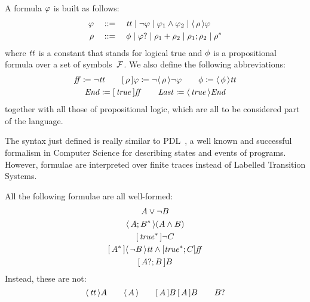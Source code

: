 \begin{definition}
	A \ldl{} formula $\varphi$ is built as follows:
	\begin{equation}
	\begin{aligned}
		\varphi \quad &::= \quad \text{\textit{tt}} \mid \neg \varphi \mid \varphi_1 \land
			\varphi_2 \mid \langle\, {\rho} \,\rangle \varphi \\
		\rho \quad &::= \quad \phi \mid \varphi? \mid \rho_1 +
			\rho_2 \mid \rho_1; \rho_2 \mid \rho^* \\
	\end{aligned}
	\label{eq:ldl-syntax}
	\end{equation}
	where $\text{\textit{tt}}$ is a constant that stands for logical true and $\phi$
	is a propositional formula over a set of symbols~$\mathcal{F}$. We also define
	the following abbreviations:
	\begin{gather*}
		\text{\textit{ff}} \coloneqq \neg \text{\textit{tt}} \qquad
		[\, {\rho} \,]\varphi \coloneqq \neg \langle\, {\rho} \,\rangle\neg \varphi
		\qquad \phi \coloneqq \langle\, {\phi} \,\rangle \text{\textit{tt}} \\
		\text{\textit{End}} \coloneqq [\, {\text{\textit{true}}} \,] \text{\textit{ff}} \qquad
		\text{\textit{Last}} \coloneqq \langle\, {\text{\textit{true}}} \,\rangle \text{\textit{End}}
	\end{gather*}
	together with all those of propositional logic, which are all to be
	considered part of the language.
	\label{def:ldlf-syntax}
\end{definition}

The syntax just defined is really similar to PDL~\cite{bib:pdl}, a well known
and successful formalism in Computer Science for describing states and events
of programs. However, \ldl{} formulae are interpreted over finite traces
instead of Labelled Transition Systems.

\begin{example}
	All the following formulae are all well-formed:
	\begin{gather*}
		A \lor \lnot B \\
		\ldiamond{A; B^*} (A \land B) \\
		\lbox{\true^*} \lnot C \\
		\lbox{A^*}\ldiamond{\lnot B}\ltt \land [\true^*; C]\lff \\
		\lbox{A?; B}B
	\end{gather*}
	Instead, these are not:
	\[
		\langle\, {\text{\textit{tt}}} \,\rangle A \qquad \langle\, {A} \,\rangle \qquad [\, {A} \,] B \, [\, {A} \,] B
		\qquad B?
	\]
\end{example}

